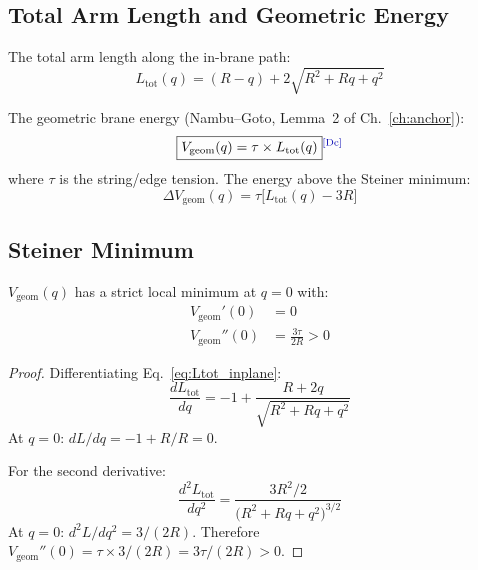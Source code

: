 \subsection{Total Arm Length and Geometric Energy}

The total arm length along the in-brane path:
\begin{equation}
    L_{\mathrm{tot}}(q) = (R - q) + 2\sqrt{R^2 + Rq + q^2}
    \label{eq:Ltot_inplane}
\end{equation}

The geometric brane energy (Nambu--Goto, Lemma~2 of Ch.~\ref{ch:anchor}):
\begin{equation}
    \boxed{V_{\mathrm{geom}}(q) = \tau \times L_{\mathrm{tot}}(q)}
    \label{eq:Vgeom_inplane}
    \tagDc
\end{equation}
where $\tau$ is the string/edge tension. The energy above the Steiner minimum:
\begin{equation}
    \Delta V_{\mathrm{geom}}(q) = \tau \bigl[L_{\mathrm{tot}}(q) - 3R\bigr]
    \label{eq:dVgeom}
\end{equation}

\subsection{Steiner Minimum}

\begin{theorem}[Steiner Minimum at $q = 0$]
\label{thm:steiner_min}
$V_{\mathrm{geom}}(q)$ has a strict local minimum at $q = 0$ with:
\begin{align}
    V_{\mathrm{geom}}'(0) &= 0 \label{eq:Vgeom_first} \\
    V_{\mathrm{geom}}''(0) &= \frac{3\tau}{2R} > 0 \label{eq:Vgeom_second}
\end{align}
\end{theorem}

\begin{proof}
Differentiating Eq.~\eqref{eq:Ltot_inplane}:
\begin{equation}
    \frac{dL_{\mathrm{tot}}}{dq} = -1 + \frac{R + 2q}{\sqrt{R^2 + Rq + q^2}}
\end{equation}
At $q = 0$: $dL/dq = -1 + R/R = 0$. \checkmark

For the second derivative:
\begin{equation}
    \frac{d^2 L_{\mathrm{tot}}}{dq^2}
    = \frac{3R^2/2}{\bigl(R^2 + Rq + q^2\bigr)^{3/2}}
\end{equation}
At $q = 0$: $d^2L/dq^2 = 3/(2R)$. Therefore
$V_{\mathrm{geom}}''(0) = \tau \times 3/(2R) = 3\tau/(2R) > 0$.
\end{proof}

